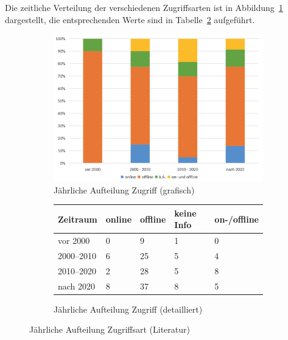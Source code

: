 Die zeitliche Verteilung der verschiedenen Zugriffsarten ist in Abbildung~\ref{fig:12-zugriff-jahr-lit} dargestellt, die entsprechenden Werte sind in Tabelle~\ref{tab:zugriff-zeit-lit} aufgeführt.

\begin{figure}[!htbp]
    \centering
    \begin{subfigure}[b]{0.48\textwidth}
        \centering
        \includegraphics[width=\textwidth]{graphics_lit/12-zugriff-jahr.png}
        \caption{Jährliche Aufteilung Zugriff (grafisch)}
        \label{fig:12-zugriff-jahr-lit}
    \end{subfigure}
    \hfill
    \begin{subfigure}[b]{0.48\textwidth}
        \centering
        \tiny
        \begin{tabularx}{\textwidth}{lXXXX}
            \hline
            \textbf{Zeitraum} & \textbf{online} & \textbf{offline} & \textbf{keine Info} & \textbf{on-/offline} \\
            \hline
            vor 2000      & 0  & 9  & 1 & 0 \\
            2000--2010    & 6  & 25 & 5 & 4 \\
            2010--2020    & 2  & 28 & 5 & 8 \\
            nach 2020     & 8  & 37 & 8 & 5 \\
            \hline
        \end{tabularx}
        \caption{Jährliche Aufteilung Zugriff (detailliert)}
        \label{tab:zugriff-zeit-lit}
    \end{subfigure}
    \caption{Jährliche Aufteilung Zugriffsart (Literatur)}
    \label{fig:zugriff-gesamt-lit}
\end{figure}

